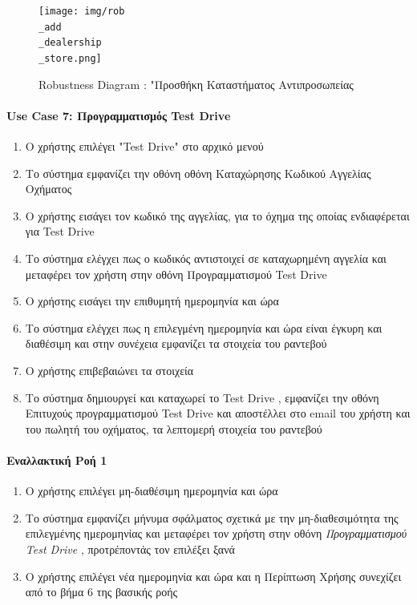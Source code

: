 \documentclass{../ol-softwaremanual}
\begin{document}
	\begin{figure}[htbp!]
		\texttt{[image: img/rob\\\_add\\\_dealership\\\_store.png]}
		\caption{\en Robustness Diagram : "\gr Προσθήκη Καταστήματος Αντιπροσωπείας}
	\end{figure}
	
	
	\newpage
	\centering
	\paragraph{\en Use Case 7: \gr Προγραμματισμός \en Test Drive \gr}
	
	\begin{enumerate}
		\item Ο χρήστης επιλέγει \en"Test Drive" \gr στο αρχικό μενού
		\item Το σύστημα εμφανίζει την οθόνη οθόνη Καταχώρησης Κωδικού Αγγελίας Οχήματος
		\item Ο χρήστης εισάγει τον κωδικό της αγγελίας, για το όχημα της οποίας ενδιαφέρεται για \en Test Drive \gr
		\item Το σύστημα ελέγχει πως ο κωδικός αντιστοιχεί σε καταχωρημένη αγγελία και μεταφέρει τον χρήστη στην οθόνη Προγραμματισμού \en Test Drive \gr
		\item Ο χρήστης εισάγει την επιθυμητή ημερομηνία και ώρα
		\item Το σύστημα ελέγχει πως η επιλεγμένη ημερομηνία και ώρα είναι έγκυρη και διαθέσιμη και στην συνέχεια εμφανίζει τα στοιχεία του ραντεβού
		\item Ο χρήστης επιβεβαιώνει τα στοιχεία
		\item Το σύστημα δημιουργεί και καταχωρεί το \en Test Drive \gr, εμφανίζει την οθόνη Επιτυχούς προγραμματισμού \en Test Drive \gr και αποστέλλει στο \en email \gr του χρήστη και του πωλητή του οχήματος, τα λεπτομερή στοιχεία του ραντεβού 
	\end{enumerate}
	
	\paragraph{Εναλλακτική Ροή 1}
	
	\begin{enumerate}
		\item Ο χρήστης επιλέγει μη-διαθέσιμη ημερομηνία και ώρα
		\item Το σύστημα εμφανίζει μήνυμα σφάλματος σχετικά με την μη-διαθεσιμότητα της επιλεγμένης ημερομηνίας και μεταφέρει τον χρήστη στην οθόνη \textit{Προγραμματισμού \en Test Drive \gr}, προτρέποντάς τον επιλέξει ξανά
		\item Ο χρήστης επιλέγει νέα ημερομηνία και ώρα και η Περίπτωση Χρήσης συνεχίζει από το βήμα 6 της βασικής ροής
	\end{enumerate}
	
\end{document}
